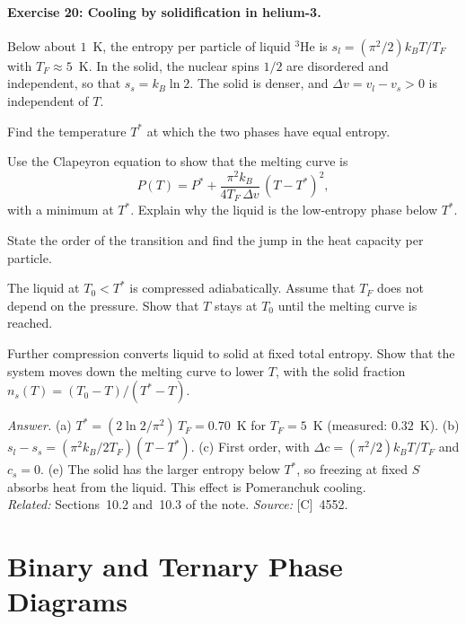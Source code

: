 \documentclass[11pt]{article}      %
\numberwithin{equation}{section}   %
\begin{document}
\paragraph{Exercise 20: Cooling by solidification in helium-3.}
Below about $1$~K, the entropy per particle of liquid $^3$He is $s_l = (\pi^2/2)k_BT/T_F$ with $T_F \approx 5$~K. In the solid, the nuclear spins $1/2$ are disordered and independent, so that $s_s = k_B\ln 2$. The solid is denser, and $\Delta v = v_l - v_s > 0$ is independent of $T$.
\begin{parts}
    \item Find the temperature $T^*$ at which the two phases have equal entropy.
    \item Use the Clapeyron equation to show that the melting curve is
    \begin{equation*}
        P(T) = P^* + \frac{\pi^2k_B}{4T_F\,\Delta v}\,(T - T^*)^2,
    \end{equation*}
    with a minimum at $T^*$. Explain why the liquid is the low-entropy phase below $T^*$.
    \item State the order of the transition and find the jump in the heat capacity per particle.
    \item The liquid at $T_0 < T^*$ is compressed adiabatically. Assume that $T_F$ does not depend on the pressure. Show that $T$ stays at $T_0$ until the melting curve is reached.
    \item Further compression converts liquid to solid at fixed total entropy. Show that the system moves down the melting curve to lower $T$, with the solid fraction $n_s(T) = (T_0 - T)/(T^* - T)$.
\end{parts}
\textit{Answer.} (a) $T^* = (2\ln 2/\pi^2)\,T_F = 0.70$~K for $T_F = 5$~K (measured: $0.32$~K). (b) $s_l - s_s = (\pi^2k_B/2T_F)(T - T^*)$. (c) First order, with $\Delta c = (\pi^2/2)k_BT/T_F$ and $c_s = 0$. (e) The solid has the larger entropy below $T^*$, so freezing at fixed $S$ absorbs heat from the liquid. This effect is Pomeranchuk cooling.\\
\textit{Related:} Sections~10.2 and~10.3 of the note. \textit{Source:} [C]~4552.

\section{Binary and Ternary Phase Diagrams}
\end{document}

